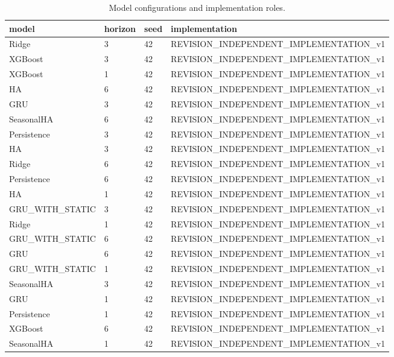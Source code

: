 \begin{table}[!htbp]
\centering
\caption{Model configurations and implementation roles.}
\begin{tabular}{llll}
\hline
model & horizon & seed & implementation \\ 
\hline
Ridge & 3 & 42 & REVISION\_INDEPENDENT\_IMPLEMENTATION\_v1 \\
XGBoost & 3 & 42 & REVISION\_INDEPENDENT\_IMPLEMENTATION\_v1 \\
XGBoost & 1 & 42 & REVISION\_INDEPENDENT\_IMPLEMENTATION\_v1 \\
HA & 6 & 42 & REVISION\_INDEPENDENT\_IMPLEMENTATION\_v1 \\
GRU & 3 & 42 & REVISION\_INDEPENDENT\_IMPLEMENTATION\_v1 \\
SeasonalHA & 6 & 42 & REVISION\_INDEPENDENT\_IMPLEMENTATION\_v1 \\
Persistence & 3 & 42 & REVISION\_INDEPENDENT\_IMPLEMENTATION\_v1 \\
HA & 3 & 42 & REVISION\_INDEPENDENT\_IMPLEMENTATION\_v1 \\
Ridge & 6 & 42 & REVISION\_INDEPENDENT\_IMPLEMENTATION\_v1 \\
Persistence & 6 & 42 & REVISION\_INDEPENDENT\_IMPLEMENTATION\_v1 \\
HA & 1 & 42 & REVISION\_INDEPENDENT\_IMPLEMENTATION\_v1 \\
GRU\_WITH\_STATIC & 3 & 42 & REVISION\_INDEPENDENT\_IMPLEMENTATION\_v1 \\
Ridge & 1 & 42 & REVISION\_INDEPENDENT\_IMPLEMENTATION\_v1 \\
GRU\_WITH\_STATIC & 6 & 42 & REVISION\_INDEPENDENT\_IMPLEMENTATION\_v1 \\
GRU & 6 & 42 & REVISION\_INDEPENDENT\_IMPLEMENTATION\_v1 \\
GRU\_WITH\_STATIC & 1 & 42 & REVISION\_INDEPENDENT\_IMPLEMENTATION\_v1 \\
SeasonalHA & 3 & 42 & REVISION\_INDEPENDENT\_IMPLEMENTATION\_v1 \\
GRU & 1 & 42 & REVISION\_INDEPENDENT\_IMPLEMENTATION\_v1 \\
Persistence & 1 & 42 & REVISION\_INDEPENDENT\_IMPLEMENTATION\_v1 \\
XGBoost & 6 & 42 & REVISION\_INDEPENDENT\_IMPLEMENTATION\_v1 \\
SeasonalHA & 1 & 42 & REVISION\_INDEPENDENT\_IMPLEMENTATION\_v1 \\
\hline
\end{tabular}
\end{table}
